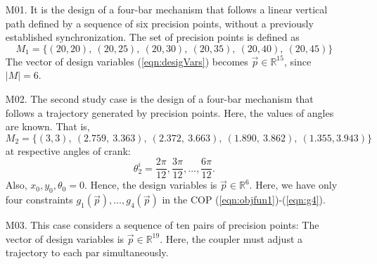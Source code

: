 \documentclass[12pt,letterpape]{article}
\begin{document}
\begin{itemize}

\item[M01.] It is the design of a four-bar mechanism that follows a linear vertical path
defined by a sequence of six precision points, without a previously established
synchronization. The set of precision points is defined as
% 
$$
	M_{1} = \{ (20, 20),\ (20, 25),\ (20, 30),\ (20, 35),\ (20, 40),\ (20, 45) \}
$$
The vector of design variables (\ref{eqn:desigVars}) becomes $ \vec{p} \in \mathbb{R}^{15} $, since $|M| = 6$. 
%
%
\item[M02.] The second study case is the design of a four-bar mechanism that follows
a trajectory generated by precision points. Here, the values of angles are known.
That is,
% 
$$
	M_{2} = \{(3, 3),\ (2.759,\ 3.363),\ (2.372,\ 3.663),\ (1.890,\ 3.862),\ (1.355, 3.943) \}
$$
% 
at respective angles of crank:
$$
	\theta_2^i = \dfrac{2\pi}{12}, \dfrac{3\pi}{12}, \ldots,\dfrac{6\pi}{12}.
$$
% 
Also, $x_0, y_0, \theta_0 = 0$. Hence, the design variables is $\vec{p} \in \mathbb{R}^6$.
Here, we have only four constraints $g_1(\vec{p}), \ldots, g_4(\vec{p})$ in the
COP (\ref{eqn:objfun1})-(\ref{eqn:g4}).


% 


\item[M03.] This case considers a sequence of ten pairs of precision points:
The vector of design variables is $ \vec{p} \in \mathbb{R}^{19} $. Here, the coupler
must adjust a trajectory to each par simultaneously.


\end{itemize}
\end{document}
